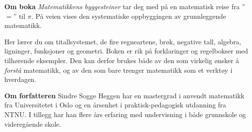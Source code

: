 


\newpage
\pagecolor{Cyan!30}
\thispagestyle{empty}
\large
\textbf{Om boka}\os
\textit{Matematikkens byggesteiner} tar deg med på en matematisk reise fra ''$=$'' til $\pi$. På veien vises den systematiske oppbyggingen av grunnleggende matematikk. \vsk

Her lærer du om titallsystemet, de fire regneartene, brøk, negative tall, algebra, ligninger, funksjoner og geometri. Boken er rik på forklaringer og regelbokser med tilhørende eksempler. Den kan derfor brukes både av den som virkelig ønsker å \textit{forstå} matematikk, og av den som bare trenger matematikk som et verktøy i hverdagen.

\vsk \vsk


\textbf{Om forfatteren} \os
Sindre Sogge Heggen har en mastergrad i anvendt matematikk fra Universitetet i Oslo og en årsenhet i praktisk-pedagogisk utdanning fra NTNU. I tillegg har han flere års erfaring med undervisning i både grunnskole og videregående skole.
